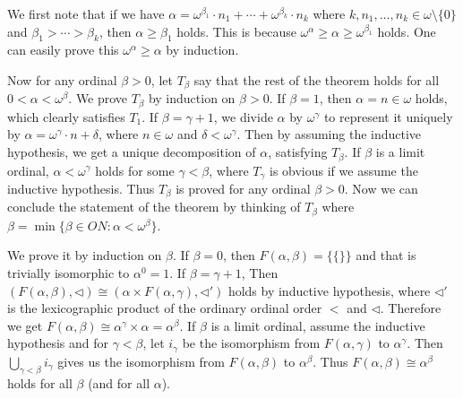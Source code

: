 \documentclass[12pt]{article}
\theoremstyle{definition}
\newenvironment{customthm}[1]
  {\renewcommand\theinnercustomthm{#1}\innercustomthm}
  {\endinnercustomthm}
\begin{document}
\begin{customthm}{I.9.54}
  We first note that if we have $\alpha=\omega^{\beta_1}\cdot n_1+\cdots+\omega^{\beta_k}\cdot n_k$ where $k,n_1,\ldots,n_k\in\omega\setminus\{0\}$ and $\beta_1>\cdots>\beta_k$, then $\alpha\geq\beta_1$ holds. This is because $\omega^\alpha\geq\alpha\geq\omega^{\beta_1}$ holds. One can easily prove this $\omega^\alpha\geq\alpha$ by induction.

  Now for any ordinal $\beta>0$, let $T_\beta$ say that the rest of the theorem holds for all $0<\alpha<\omega^\beta$. We prove $T_\beta$ by induction on $\beta>0$. If $\beta=1$, then $\alpha=n\in\omega$ holds, which clearly satisfies $T_1$. If $\beta=\gamma+1$, we divide $\alpha$ by $\omega^\gamma$ to represent it uniquely by $\alpha=\omega^\gamma\cdot n+\delta$, where $n\in\omega$ and $\delta<\omega^\gamma$. Then by assuming the inductive hypothesis, we get a unique decomposition of $\alpha$, satisfying $T_\beta$. If $\beta$ is a limit ordinal, $\alpha<\omega^\gamma$ holds for some $\gamma<\beta$, where $T_\gamma$ is obvious if we assume the inductive hypothesis. Thus $T_\beta$ is proved for any ordinal $\beta>0$. Now we can conclude the statement of the theorem by thinking of $T_\beta$ where $\beta=\min\{\beta\in ON:\alpha<\omega^\beta\}$.
\end{customthm}

\begin{customthm}{I.9.55}
  We prove it by induction on $\beta$. If $\beta=0$, then $F(\alpha,\beta)=\{\{\}\}$ and that is trivially isomorphic to $\alpha^0=1$. If $\beta=\gamma+1$, Then $(F(\alpha,\beta),\triangleleft)\cong(\alpha\times F(\alpha,\gamma),\triangleleft')$ holds by inductive hypothesis, where $\triangleleft'$ is the lexicographic product of the ordinary ordinal order $<$ and $\triangleleft$. Therefore we get $F(\alpha,\beta)\cong\alpha^\gamma\times\alpha=\alpha^{\beta}$. If $\beta$ is a limit ordinal, assume the inductive hypothesis and for $\gamma<\beta$, let $i_\gamma$ be the isomorphism from $F(\alpha,\gamma)$ to $\alpha^\gamma$. Then $\bigcup_{\gamma<\beta}i_\gamma$ gives us the isomorphism from $F(\alpha,\beta)$ to $\alpha^\beta$. Thus $F(\alpha,\beta)\cong\alpha^\beta$ holds for all $\beta$ (and for all $\alpha$).
\end{customthm}
\end{document}

